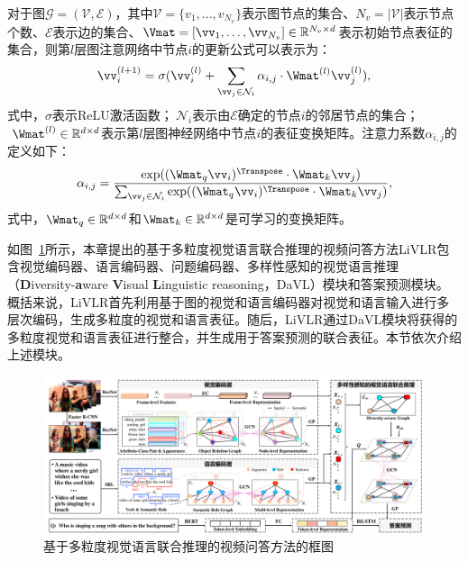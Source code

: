 对于图$\mathcal{G} = (\mathcal{V}, \mathcal{E})$，其中$\mathcal{V} = \{v_1, ..., v_{N_v}\}$表示图节点的集合、$N_v = |\mathcal{V}|$表示节点个数、$\mathcal{E}$表示边的集合、$\Vmat = [\vv_1, \dots, \vv_{N_v}] \in \mathbb{R}^{N_v\times d}$表示初始节点表征的集合，则第$l$层图注意网络中节点$i$的更新公式可以表示为：
\begin{equation}
\vv_i^{(l+1)} = \sigma (\vv_i^{(l)} + \sum_{\vv_j \in \mathcal{N}_i} \alpha_{i,j} \cdot \Wmat^{(l)} \vv_j^{(l)}), 
\label{eq:attention_gcn}
\end{equation}
式中，$\sigma$表示ReLU激活函数；$~\mathcal{N}_i$表示由$\mathcal{E}$确定的节点$i$的邻居节点的集合；$~\Wmat^{(l)} \in \mathbb{R}^{d \times d}$表示第$l$层图神经网络中节点$i$的表征变换矩阵。注意力系数$\alpha_{i, j}$的定义如下：
\begin{equation} 
\alpha_{i, j} = \frac{\exp((\Wmat_q \vv_i)^{\Transpose} \cdot \Wmat_k \vv_j)}{\sum_{\vv_j \in \mathcal{N}_i}\exp((\Wmat_q \vv_i)^{\Transpose} \cdot \Wmat_k \vv_j)},
\label{eq:attn_factor}
\end{equation}
式中，$\Wmat_q \in \mathbb{R}^{d \times d}$和$\Wmat_k \in \mathbb{R}^{d \times d}$是可学习的变换矩阵。


如图~\ref{fig:c2_framework}所示，本章提出的基于多粒度视觉语言联合推理的视频问答方法LiVLR包含视觉编码器、语言编码器、问题编码器、多样性感知的视觉语言推理（\textbf{D}iversity-\textbf{a}ware \textbf{V}isual \textbf{L}inguistic reasoning，DaVL）模块和答案预测模块。
概括来说，LiVLR首先利用基于图的视觉和语言编码器对视觉和语言输入进行多层次编码，生成多粒度的视觉和语言表征。随后，LiVLR通过DaVL模块将获得的多粒度视觉和语言表征进行整合，并生成用于答案预测的联合表征。本节依次介绍上述模块。


\begin{figure}[!t]
\centering
\includegraphics[width=1.0\linewidth]{figure/c2_frame.pdf}
\caption{基于多粒度视觉语言联合推理的视频问答方法的框图}
\label{fig:c2_framework}
\end{figure}


